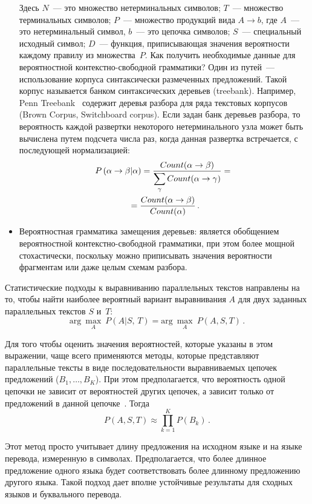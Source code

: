 \begin{multicols}{2}
\begin{itemize}
Здесь $N$~--- это множество нетерминальных символов; $T$~---
множество терминальных символов; $P$~--- множество продукций вида
$A\rightarrow b$, где $A$~--- это нетерминальный символ, $b$~--- это
цепочка символов; $S$~--- специальный исходный символ; $D$~---
функция, приписывающая значения вероятности каж\-до\-му правилу из
множества~$P$. Как получить необходимые данные для вероятностной
контекстно-свободной грамматики? Один из путей~--- использование
корпуса синтаксически размеченных предложений. Такой корпус называется
банком синтаксических деревьев (treebank). Например, Penn
Treebank~\cite{37koz}  содержит деревья разбора для ряда текстовых
корпусов (Brown Corpus, Switchboard corpus). Если задан банк деревьев
разбора, то вероятность каж\-дой развертки некоторого нетерминального узла
может быть вычислена путем подсчета числа раз, когда данная развертка
встречается, с последующей нормализацией:
\begin{multline*}
P\left(\alpha\rightarrow \beta \vert \alpha\right) = \displaystyle\frac{\displaystyle Count (\alpha 
\rightarrow \beta
)\mathstrut}{\displaystyle \sum_\gamma Count (\alpha \rightarrow \gamma )\mathstrut} ={}\\
{}= \displaystyle\frac{\displaystyle Count (\alpha\rightarrow \beta )\mathstrut}{\displaystyle Count (\alpha )\mathstrut}\,. 
\end{multline*}
\item Вероятностная грамматика замещения деревьев:
является обобщением вероятностной контекстно-свободной грамматики, при
этом более мощной стохастически, поскольку можно приписывать значения
вероятности фрагментам или даже целым схемам разбора.
\end{itemize}

Статистические подходы к выравниванию параллельных текстов
направлены на то, чтобы найти наиболее вероятный вариант выравнивания
$A$ для двух заданных параллельных текстов $S$ и~$T$:
$$
\mathrm{arg}\ \underset{A}{\max}\  P (A\vert S,\,T) =
\mathrm{arg}\  \underset{A}{\max}\  P(A,S,T)\,.
$$

Для того чтобы оценить значения вероятностей, которые указаны в этом
выражении, чаще всего применяются методы, которые пред\-став\-ля\-ют
параллельные тексты в виде последовательности выравниваемых цепочек
предложений ($B_1, \ldots , B_K$).  При этом предполагается, что вероятность
одной цепочки не зависит от вероятностей других цепочек, а зависит только
от предложений в данной цепочке~\cite{38koz}. Тогда
$$
P(A,S,T) \approx \prod\limits_{k=1}^K P(B_k)\,.
$$

Этот метод просто учитывает длину предложения на исходном языке и на
языке перевода, измеренную в символах. Предполагается, что более длинное
предложение одного языка будет соответствовать более длинному
предложению другого языка. Такой подход дает вполне устойчивые
результаты для сходных языков и буквального перевода.


\end{multicols}
